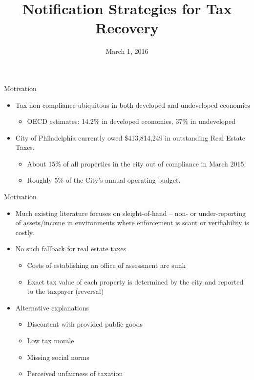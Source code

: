 \documentclass[ignorenonframetext,]{beamer}
\title{Notification Strategies for Tax Recovery}
\author{Michael Chirico\footnote<.->{The research presented here was supported
  in part by the Institute of Education Sciences, U.S. Department of
  Education, through Grant \#R305B090015 to the University of
  Pennsylvania. The opinions expressed are those of the presenter and do
  not represent the views of the Institute or the U.S. Department of
  Education.}, Robert Inman, Charles Loeffler, John MacDonald, Holger
Sieg}
\date{March 1, 2016}
\providecommand{\tightlist}{%
  \setlength{\itemsep}{0pt}\setlength{\parskip}{0pt}}
\begin{document}
\frame{\titlepage}

\begin{frame}{Motivation}

\begin{itemize}
\item
  Tax non-compliance ubiquitous in both developed and undeveloped
  economies

  \begin{itemize}
  \tightlist
  \item
    OECD estimates: 14.2\% in developed economies, 37\% in undeveloped
  \end{itemize}
\item
  City of Philadelphia currently owed \$413,814,249 in outstanding Real
  Estate Taxes.

  \begin{itemize}
  \item
    About 15\% of all properties in the city out of compliance in March
    2015.
  \item
    Roughly 5\% of the City's annual operating budget.
  \end{itemize}
\end{itemize}

\end{frame}

\begin{frame}{Motivation}

\begin{itemize}
\item
  Much existing literature focuses on sleight-of-hand -- non- or
  under-reporting of assets/income in environments where enforcement is
  scant or verifiability is costly.
\item
  No such fallback for real estate taxes

  \begin{itemize}
  \item
    Costs of establishing an office of assessment are sunk
  \item
    Exact tax value of each property is determined by the city and
    reported to the taxpayer (reversal)
  \end{itemize}
\item
  Alternative explanations

  \begin{itemize}
  \item
    Discontent with provided public goods
  \item
    Low tax morale
  \item
    Missing social norms
  \item
    Perceived unfairness of taxation
  \end{itemize}
\end{itemize}

\end{frame}
\end{document}
